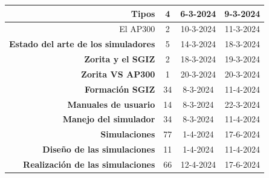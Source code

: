 \begin{table}[!h]
\begin{tabular}{|r|c|c|c|}
    \rowcolor[HTML]{ECF4FF} 
    Tipos                                                        & 4                         & 6-3-2024                          & 9-3-2024                          \\ \hline
    \rowcolor[HTML]{ECF4FF} 
    El AP300                                                     & 2                         & 10-3-2024                         & 11-3-2024                         \\ \hline
    \rowcolor[HTML]{CBE5CB} 
    \textbf{Estado del arte de los simuladores}                  & 5                         & 14-3-2024                         & 18-3-2024                         \\ \hline
    \rowcolor[HTML]{CBE5CB} 
    \textbf{Zorita y el SGIZ}                                    & 2                         & 18-3-2024                         & 19-3-2024                         \\ \hline
    \rowcolor[HTML]{ECF4FF} 
    \textbf{Zorita VS AP300}                                     & 1                         & 20-3-2024                         & \cellcolor[HTML]{ECF4FF}20-3-2024 \\ \hline
    \rowcolor[HTML]{FFCE93} 
    \textbf{Formación SGIZ}                                      & 34                        & 8-3-2024                          & 11-4-2024                         \\ \hline
    \rowcolor[HTML]{CBE5CB} 
    \textbf{Manuales de usuario}                                 & 14                        & 8-3-2024                          & 22-3-2024                         \\ \hline
    \rowcolor[HTML]{CBE5CB} 
    \cellcolor[HTML]{CBE5CB}\textbf{Manejo del simulador}        & 34                        & 8-3-2024                          & 11-4-2024                         \\ \hline
    \rowcolor[HTML]{FFCE93} 
    \textbf{Simulaciones}                                        & 77                        & 1-4-2024                          & 17-6-2024                         \\ \hline
    \rowcolor[HTML]{CBE5CB} 
    \textbf{Diseño de las simulaciones}                          & 11                        & 1-4-2024                          & 11-4-2024                         \\ \hline
    \rowcolor[HTML]{CBE5CB} 
    \textbf{Realización de las simulaciones}                     & 66                        & 12-4-2024                         & 17-6-2024                         \\ \hline

\end{tabular}
\end{table}
